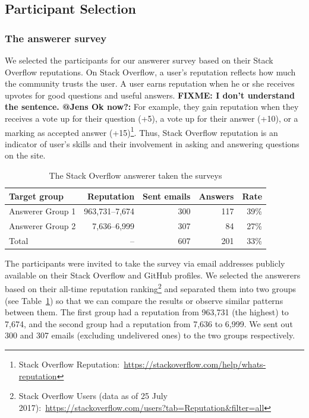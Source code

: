 \documentclass{svjour3}                     %
\newcommand\FIXME[1]{{\color{red}\textbf{FIXME: #1}}}
\begin{document}
\subsection{Participant Selection}

\subsubsection{The answerer survey} 
We selected the participants for our answerer survey based on their Stack
Overflow reputations. On Stack Overflow, a user's reputation reflects how much
the community trusts the user. A user earns reputation when he or she receives
upvotes for good questions and useful answers. \FIXME{I don't understand the
	sentence. @Jens Ok now?:} For example, they gain reputation when they receives a vote up for
their question (+5), a vote up for their answer (+10), or a marking as accepted answer (+15)\footnote{Stack
	Overflow Reputation:~\url{https://stackoverflow.com/help/whats-reputation}}. Thus, Stack
Overflow reputation is an indicator of user's skills and their involvement in
asking and answering questions on the site.

\begin{table}
	\centering
	\caption{The Stack Overflow answerer taken the surveys}
	\label{tab:answerers}
	\begin{tabular}{lrrrr}
		\toprule
		Target group & Reputation & Sent emails & Answers & Rate \\
		\midrule
		Answerer Group 1 & 963,731--7,674 & 300 & 117 & 39\% \\
		Answerer Group 2 & 7,636--6,999 & 307 & 84 & 27\% \\
		\midrule
		Total & -- & 607 & 201 & 33\% \\
		\bottomrule
	\end{tabular}
\end{table}

The participants were invited to take the survey via email addresses publicly
available on their Stack Overflow and GitHub profiles. We selected the answerers
based on their all-time reputation ranking\footnote{Stack Overflow Users (data as of
	25 July 2017):~\url{https://stackoverflow.com/users?tab=Reputation&filter=all}}
and separated them into two groups (see Table~\ref{tab:answerers}) so that we
can compare the results or observe similar patterns between them. The first
group had a reputation from 963,731 (the highest) to 7,674, and the second group
had a reputation from 7,636 to 6,999. We sent out 300 and 307 emails
(excluding undelivered ones) to the two groups respectively. 
\end{document}
